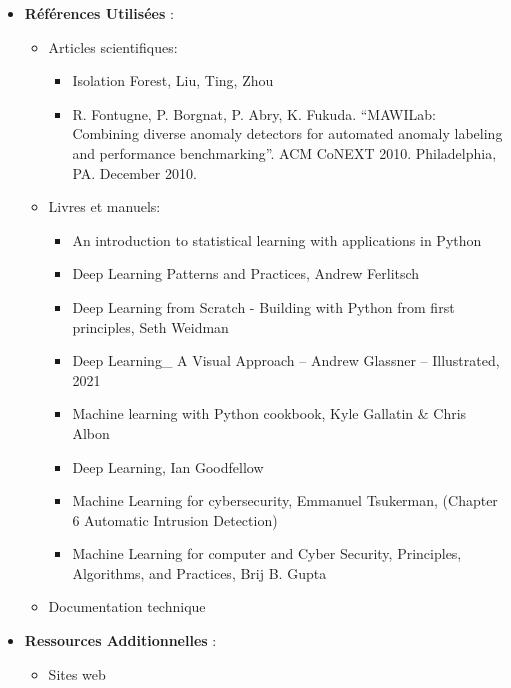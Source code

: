 \documentclass[
  letterpaper,
  DIV=11,
  numbers=noendperiod]{scrartcl}
\providecommand{\tightlist}{%
  \setlength{\itemsep}{0pt}\setlength{\parskip}{0pt}}\usepackage{longtable,booktabs,array}
\begin{document}
\begin{itemize}
\tightlist
\item
  \textbf{Références Utilisées} :

  \begin{itemize}
  \tightlist
  \item
    Articles scientifiques:

    \begin{itemize}
    \tightlist
    \item
      Isolation Forest, Liu, Ting, Zhou
    \item
      R. Fontugne, P. Borgnat, P. Abry, K. Fukuda. ``MAWILab: Combining
      diverse anomaly detectors for automated anomaly labeling and
      performance benchmarking''. ACM CoNEXT 2010. Philadelphia, PA.
      December 2010.
    \end{itemize}
  \item
    Livres et manuels:

    \begin{itemize}
    \tightlist
    \item
      An introduction to statistical learning with applications in
      Python
    \item
      Deep Learning Patterns and Practices, Andrew Ferlitsch
    \item
      Deep Learning from Scratch - Building with Python from first
      principles, Seth Weidman
    \item
      Deep Learning\_ A Visual Approach -- Andrew Glassner --
      Illustrated, 2021
    \item
      Machine learning with Python cookbook, Kyle Gallatin \& Chris
      Albon
    \item
      Deep Learning, Ian Goodfellow
    \item
      Machine Learning for cybersecurity, Emmanuel Tsukerman, (Chapter 6
      Automatic Intrusion Detection)
    \item
      Machine Learning for computer and Cyber Security, Principles,
      Algorithms, and Practices, Brij B. Gupta
    \end{itemize}
  \item
    Documentation technique
  \end{itemize}
\item
  \textbf{Ressources Additionnelles} :

  \begin{itemize}
  \tightlist
  \item
    Sites web


\end{itemize}
\end{itemize}
\end{document}
